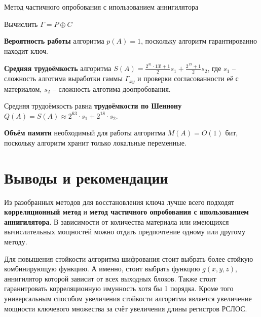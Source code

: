 \documentclass[a4paper,12pt]{article}
\theoremstyle{definition}
\begin{document}
	
	\begin{algorithm}[H]
		
		\caption{Метод частичного опробования с ипользованием аннигилятора}
		\label{alg:Annig}
		\SetAlgoNoEnd
		
		
		Вычислить $\Gamma = P \oplus C $ 
		
	\end{algorithm}	

	\textbf{Вероятность работы} алгоритма $p(A)=1$, поскольку алгоритм гарантированно находит ключ. 
	
	\textbf{Средняя трудоёмкость} алгоритма $S(A)= \frac{2^{31} \cdot 13! + 1}{2} s_1 + \frac{2^{19} + 1}{2} s_2$, где $s_1$ -- сложность алготима выработки гаммы $\Gamma_{x y}$ и проверки согласованности её с материалом, $s_2$ -- сложность алготима доопробования. 
	
	Средняя трудоёмкость равна \textbf{трудоёмкости по Шеннону} $Q(A) = S(A) \approx 2^{63} \cdot s_1 + 2^{18} \cdot s_2$.
	
	\textbf{Объём памяти} необходимый для работы алгоритма $M(A) = O(1)$ бит, поскольку алгоритм хранит только локальные переменные.
	
	\section{Выводы и рекомендации}
	
	Из разобранных методов для восстановления ключа лучше всего подходят \textbf{корреляционный метод} и \textbf{метод частичного опробования с ипользованием аннигилятора}. В зависимости от количества материала или имеющихся вычислительных мощностей можно отдать предпочтение одному или другому методу. 
	
	Для повышения стойкости алгоритма шифрования стоит выбрать более стойкую комбинирующую функцию. А именно, стоит выбрать функцию $g(x,y,z)$, аннигилятор которой зависит от всех выходных блоков. Также стоит гаранитровать корреляционную имунность хотя бы 1 порядка. Кроме того универсальным способом увеличения стойкости алгоритма является увеличение мощности ключевого множества за счёт увеличения длины регистров РСЛОС.
			
\end{document}
